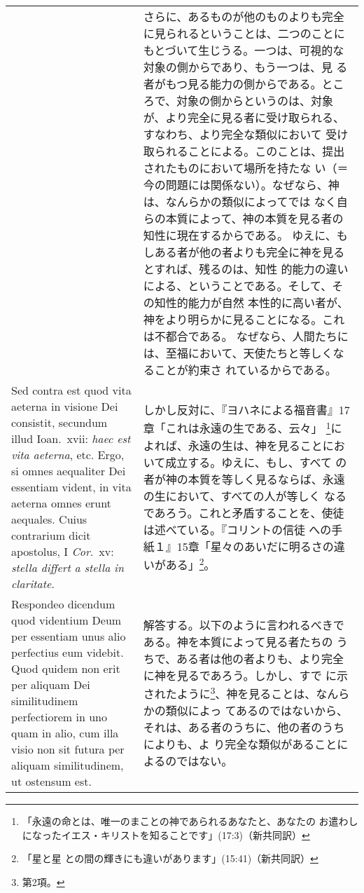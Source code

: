 \documentclass[10pt]{jsarticle} %
\begin{document}
\begin{longtable}{p{21em}p{21em}}
&


さらに、あるものが他のものよりも完全に見られるということは、二つのことに
もとづいて生じうる。一つは、可視的な対象の側からであり、もう一つは、見
る者がもつ見る能力の側からである。ところで、対象の側からというのは、対象
が、より完全に見る者に受け取られる、すなわち、より完全な類似において
受け取られることによる。このことは、提出されたものにおいて場所を持たな
い（＝今の問題には関係ない）。なぜなら、神は、なんらかの類似によってでは
なく自らの本質によって、神の本質を見る者の知性に現在するからである。
ゆえに、もしある者が他の者よりも完全に神を見るとすれば、残るのは、知性
的能力の違いによる、ということである。そして、その知性的能力が自然
本性的に高い者が、神をより明らかに見ることになる。これは不都合である。
なぜなら、人間たちには、至福において、天使たちと等しくなることが約束さ
れているからである。


\\


{\sc Sed contra est} quod vita aeterna in visione Dei consistit,
secundum illud Ioan.\ {\sc xvii}: {\it haec est vita aeterna},
etc. Ergo, si omnes aequaliter Dei essentiam vident, in vita aeterna
omnes erunt aequales. Cuius contrarium dicit apostolus, I {\it Cor}.\
{\sc xv}: {\it stella differt a stella in claritate}.

&

しかし反対に、『ヨハネによる福音書』17章「これは永遠の生である、云々」
\footnote{「永遠の命とは、唯一のまことの神であられるあなたと、あなたの
お遣わしになったイエス・キリストを知ることです」(17:3)（新共同訳）}に
よれば、永遠の生は、神を見ることにおいて成立する。ゆえに、もし、すべて
の者が神の本質を等しく見るならば、永遠の生において、すべての人が等しく
なるであろう。これと矛盾することを、使徒は述べている。『コリントの信徒
への手紙１』15章「星々のあいだに明るさの違いがある」\footnote{「星と星
との間の輝きにも違いがあります」(15:41)（新共同訳）}。

\\


{\sc Respondeo dicendum} quod videntium Deum per essentiam unus alio
perfectius eum videbit. Quod quidem non erit per aliquam Dei
similitudinem perfectiorem in uno quam in alio, cum illa visio non sit
futura per aliquam similitudinem, ut ostensum est. 

&

解答する。以下のように言われるべきである。神を本質によって見る者たちの
うちで、ある者は他の者よりも、より完全に神を見るであろう。しかし、すで
に示されたように\footnote{第2項。}、神を見ることは、なんらかの類似によっ
てあるのではないから、それは、ある者のうちに、他の者のうちによりも、よ
り完全な類似があることによるのではない。


\end{longtable}
\end{document}
